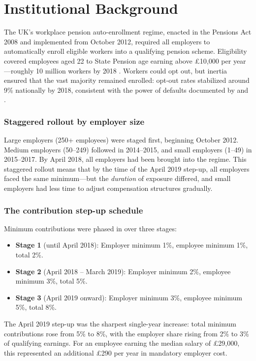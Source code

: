 \documentclass[12pt]{article}
\begin{document}
\section{Institutional Background}
\label{sec:background}

The UK's workplace pension auto-enrollment regime, enacted in the Pensions Act 2008 and implemented from October 2012, required all employers to automatically enroll eligible workers into a qualifying pension scheme. Eligibility covered employees aged 22 to State Pension age earning above \pounds10,000 per year---roughly 10 million workers by 2018 \citep{dwp2023}. Workers could opt out, but inertia ensured that the vast majority remained enrolled: opt-out rates stabilized around 9\% nationally by 2018, consistent with the power of defaults documented by \citet{madrian2001} and \citet{thaler2004}.

\subsubsection*{Staggered rollout by employer size} Large employers (250+ employees) were staged first, beginning October 2012. Medium employers (50--249) followed in 2014--2015, and small employers (1--49) in 2015--2017. By April 2018, all employers had been brought into the regime. This staggered rollout means that by the time of the April 2019 step-up, all employers faced the same minimum---but the \textit{duration} of exposure differed, and small employers had less time to adjust compensation structures gradually.

\subsubsection*{The contribution step-up schedule} Minimum contributions were phased in over three stages:
\begin{itemize}
    \item \textbf{Stage 1} (until April 2018): Employer minimum 1\%, employee minimum 1\%, total 2\%.
    \item \textbf{Stage 2} (April 2018 -- March 2019): Employer minimum 2\%, employee minimum 3\%, total 5\%.
    \item \textbf{Stage 3} (April 2019 onward): Employer minimum 3\%, employee minimum 5\%, total 8\%.
\end{itemize}
The April 2019 step-up was the sharpest single-year increase: total minimum contributions rose from 5\% to 8\%, with the employer share rising from 2\% to 3\% of qualifying earnings. For an employee earning the median salary of \pounds29,000, this represented an additional \pounds290 per year in mandatory employer cost.
\end{document}
